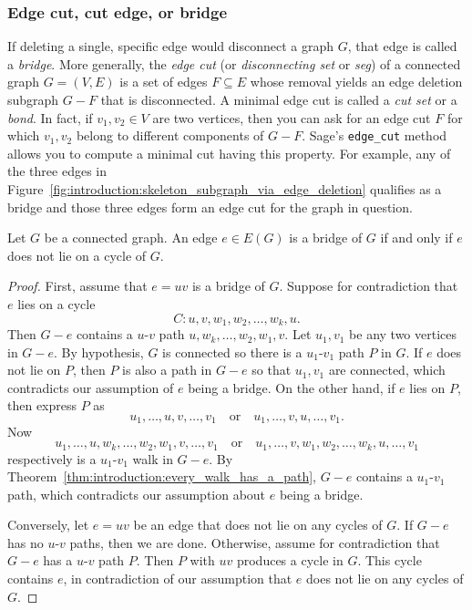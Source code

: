 
\subsubsection{Edge cut, cut edge, or bridge}

If deleting a single, specific edge would disconnect a graph $G$, that
edge is called a \emph{bridge}. More generally, the \emph{edge cut}
(or \emph{disconnecting set} or \emph{seg}) of a connected graph
$G = (V, E)$ is a set of edges $F \subseteq E$ whose removal yields an
edge deletion subgraph $G - F$ that is disconnected. A minimal edge
cut is called a \emph{cut set} or a \emph{bond}.
In fact, if $v_1, v_2 \in V$ are two vertices, then you can ask for an
edge cut $F$ for which $v_1, v_2$ belong to different components of
$G - F$. Sage's \verb!edge_cut! method allows you to compute a minimal
cut having this property. For example, any of the three edges in
Figure~\ref{fig:introduction:skeleton_subgraph_via_edge_deletion}
qualifies as a bridge and those three edges form an edge cut for the
graph in question.

\begin{theorem}
\label{thm:inroduction:edge_is_bridge_iff_edge_not_on_cycle}
Let $G$ be a connected graph. An edge $e \in E(G)$ is a bridge of $G$
if and only if $e$ does not lie on a cycle of $G$.
\end{theorem}

\begin{proof}
First, assume that $e = uv$ is a bridge of $G$. Suppose for
contradiction that $e$ lies on a cycle
\[
C: u, v, w_1, w_2, \dots, w_k, u.
\]
Then $G - e$ contains a $u$-$v$ path
$u, w_k, \dots, w_2, w_1, v$. Let $u_1, v_1$ be any two vertices in
$G - e$. By hypothesis, $G$ is connected so there is a $u_1$-$v_1$
path $P$ in $G$. If $e$ does not lie on $P$, then $P$ is also a path
in $G - e$ so that $u_1, v_1$ are connected, which contradicts our
assumption of $e$ being a bridge. On the other hand, if $e$ lies on
$P$, then express $P$ as
\[
u_1, \dots, u, v, \dots, v_1
\quad\text{or}\quad
u_1, \dots, v, u, \dots, v_1.
\]
Now
\[
u_1, \dots, u, w_k, \dots, w_2, w_1, v, \dots, v_1
\quad\text{or}\quad
u_1, \dots, v, w_1, w_2, \dots, w_k, u, \dots, v_1
\]
respectively is a $u_1$-$v_1$ walk in $G - e$. By
Theorem~\ref{thm:introduction:every_walk_has_a_path}, $G - e$
contains a $u_1$-$v_1$ path, which contradicts our assumption about
$e$ being a bridge.

Conversely, let $e = uv$ be an edge that does not lie on any cycles of
$G$. If $G - e$ has no $u$-$v$ paths, then we are done. Otherwise,
assume for contradiction that $G - e$ has a $u$-$v$ path $P$. Then $P$
with $uv$ produces a cycle in $G$. This cycle contains $e$, in
contradiction of our assumption that $e$ does not lie on any cycles of
$G$.
\end{proof}


